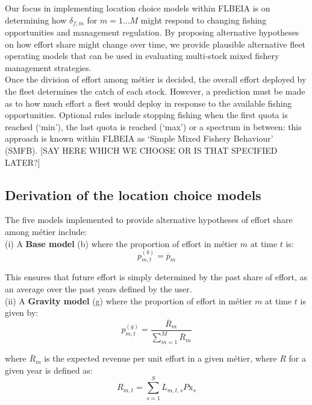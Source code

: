 \documentclass[12pt, halfline, a4paper]{ouparticle}
\begin{document}
Our focus in implementing location choice models within FLBEIA is on
determining how $\delta_{f,m}$ for $m=1...M$ might respond to changing fishing
opportunities and management regulation. By proposing alternative hypotheses on how
effort share might change over time, we provide plausible alternative fleet
operating models that can be used in evaluating multi-stock mixed fishery management strategies.
\\

Once the division of effort among métier is decided, the overall effort deployed
by the fleet determines the catch of each stock. However, a prediction must be
made as to how much effort a fleet would deploy in response to the available
fishing opportunities. Optional rules include stopping fishing when the first
quota is reached (`min'), the last quota is reached (`max') or a spectrum in
between: this approach is known within FLBEIA as `Simple Mixed Fishery
Behaviour' (SMFB). [SAY HERE WHICH WE CHOOSE OR IS THAT SPECIFIED LATER?]

\subsection{Derivation of the location choice models}

The five models implemented to provide alternative hypotheses of effort share
among métier include:\\

(i) A \textbf{Base model} (b) where the proportion of effort in métier $m$ at time
$t$ is:
\begin{equation}
p^{(b)}_{m,t} = \overline{p}_{m}
\end{equation}

This ensures that future effort is simply determined by the past share of
effort, as an average over the past years defined by the user. \\

(ii) A \textbf{Gravity model} (g) where the proportion of effort in métier $m$ at
time $t$ is given by: 
\begin{equation}
p^{(g)}_{m,t} = \frac{\overline{R}_{m}}{\sum\limits_{m=1}^{M}\overline{R}_{m}} 
\end{equation}

where $\overline{R}_m$ is the expected revenue per unit effort in a given
métier, where $R$ for a given year is defined as: 
\begin{equation}
R_{m,t} =  \sum\limits_{s=1}^{S} L_{m,t,s} P\text{x}_{s} 
\label{eqn:ppue}
\end{equation}
\end{document}
